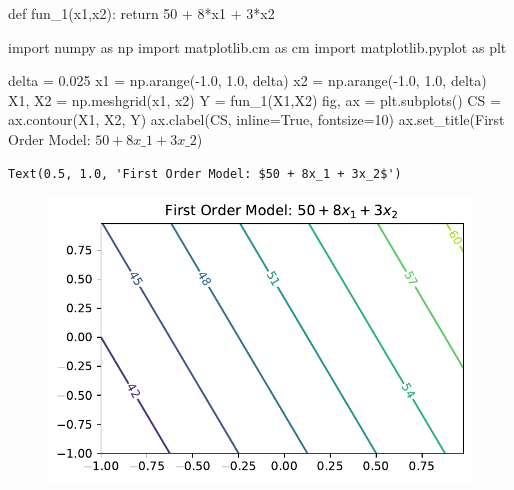 \documentclass[
  letterpaper,
  DIV=11,
  numbers=noendperiod]{scrreprt}
\newenvironment{Shaded}{\begin{snugshade}}{\end{snugshade}}
\newcommand{\ControlFlowTok}[1]{\textcolor[rgb]{0.00,0.23,0.31}{#1}}
\newcommand{\DecValTok}[1]{\textcolor[rgb]{0.68,0.00,0.00}{#1}}
\newcommand{\FloatTok}[1]{\textcolor[rgb]{0.68,0.00,0.00}{#1}}
\newcommand{\ImportTok}[1]{\textcolor[rgb]{0.00,0.46,0.62}{#1}}
\newcommand{\KeywordTok}[1]{\textcolor[rgb]{0.00,0.23,0.31}{#1}}
\newcommand{\NormalTok}[1]{\textcolor[rgb]{0.00,0.23,0.31}{#1}}
\newcommand{\OperatorTok}[1]{\textcolor[rgb]{0.37,0.37,0.37}{#1}}
\newcommand{\StringTok}[1]{\textcolor[rgb]{0.13,0.47,0.30}{#1}}
\newcommand{\VariableTok}[1]{\textcolor[rgb]{0.07,0.07,0.07}{#1}}
\begin{document}
\begin{Shaded}
\begin{Highlighting}[]
\KeywordTok{def}\NormalTok{ fun\_1(x1,x2):}
    \ControlFlowTok{return} \DecValTok{50} \OperatorTok{+} \DecValTok{8}\OperatorTok{*}\NormalTok{x1 }\OperatorTok{+} \DecValTok{3}\OperatorTok{*}\NormalTok{x2}
\end{Highlighting}
\end{Shaded}

\begin{Shaded}
\begin{Highlighting}[]
\ImportTok{import}\NormalTok{ numpy }\ImportTok{as}\NormalTok{ np}
\ImportTok{import}\NormalTok{ matplotlib.cm }\ImportTok{as}\NormalTok{ cm}
\ImportTok{import}\NormalTok{ matplotlib.pyplot }\ImportTok{as}\NormalTok{ plt}

\NormalTok{delta }\OperatorTok{=} \FloatTok{0.025}
\NormalTok{x1 }\OperatorTok{=}\NormalTok{ np.arange(}\OperatorTok{{-}}\FloatTok{1.0}\NormalTok{, }\FloatTok{1.0}\NormalTok{, delta)}
\NormalTok{x2 }\OperatorTok{=}\NormalTok{ np.arange(}\OperatorTok{{-}}\FloatTok{1.0}\NormalTok{, }\FloatTok{1.0}\NormalTok{, delta)}
\NormalTok{X1, X2 }\OperatorTok{=}\NormalTok{ np.meshgrid(x1, x2)}
\NormalTok{Y }\OperatorTok{=}\NormalTok{ fun\_1(X1,X2)}
\NormalTok{fig, ax }\OperatorTok{=}\NormalTok{ plt.subplots()}
\NormalTok{CS }\OperatorTok{=}\NormalTok{ ax.contour(X1, X2, Y)}
\NormalTok{ax.clabel(CS, inline}\OperatorTok{=}\VariableTok{True}\NormalTok{, fontsize}\OperatorTok{=}\DecValTok{10}\NormalTok{)}
\NormalTok{ax.set\_title(}\StringTok{\textquotesingle{}First Order Model: $50 + 8x\_1 + 3x\_2$\textquotesingle{}}\NormalTok{)}
\end{Highlighting}
\end{Shaded}

\begin{verbatim}
Text(0.5, 1.0, 'First Order Model: $50 + 8x_1 + 3x_2$')
\end{verbatim}

\begin{figure}[H]

{\centering \includegraphics{005_num_rsm_files/figure-pdf/cell-5-output-2.pdf}

}

\end{figure}
\end{document}
